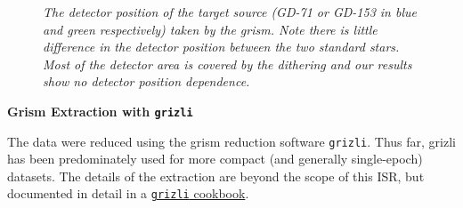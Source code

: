 \documentclass[12pt]{article}
\begin{document}
{{%
\begin{figure}[h!]
	\caption{\textit{The detector position of the target source (GD-71 or
        GD-153 in blue and green respectively) taken by the grism. Note there
        is little difference in the detector position between the two standard
        stars. 
        Most of the detector area is covered by the dithering and our results
        show no detector position dependence.}}
\label{fig:detector_pos}
\end{figure}

{\bf Grism Extraction with \texttt{grizli}}

The data were reduced using the grism reduction software \texttt{grizli}. Thus far, grizli 
has been predominately used for more compact (and generally single-epoch) datasets. The details of the
extraction are beyond the scope of this ISR, but documented in detail in a 
\href{http://grizli-calibration.readthedocs.io/en/latest/}{\color{blue} \texttt{grizli} cookbook}.

}}
\end{document}
